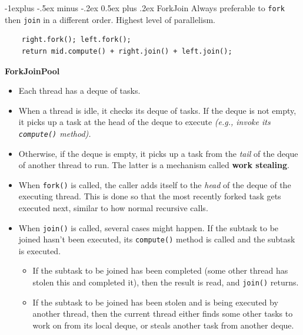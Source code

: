 \documentclass[10pt, landscape]{article}
\makeatletter
\renewcommand{\subsection}{\@startsection{subsection}{2}{0mm}%
                                {-1explus -.5ex minus -.2ex}%
                                {0.5ex plus .2ex}%
                                {\normalfont\normalsize\bfseries}}
\newcommand{\code}[1]{\textcolor{mygreen}{\texttt{#1}}}
\makeatother
\begin{document}
\begin{multicols}{2}
\subsection{ForkJoin}
Always preferable to \code{fork} then \code{join} in a different order. Highest level of parallelism.
\begin{verbatim}
    right.fork(); left.fork();
    return mid.compute() + right.join() + left.join();
\end{verbatim}

\textbf{ForkJoinPool}

\begin{itemize}
    \item Each thread has a deque of tasks.
    \item When a thread is idle, it checks its deque of tasks. If the deque is not empty, it picks up a task at the head of the deque to execute \textit{(e.g., invoke its \code{compute()} method).}
    \item Otherwise, if the deque is empty, it picks up a task from the \textit{tail} of the deque of another thread to run. The latter is a mechanism called \textbf{work stealing}.
    \item When \code{fork()} is called, the caller adds itself to the \textit{head} of the deque of the executing thread. This is done so that the most recently forked task gets executed next, similar to how normal recursive calls.
    \item When \code{join()} is called, several cases might happen. If the subtask to be joined hasn't been executed, its \code{compute()} method is called and the subtask is executed.
    \begin{itemize}
        \item If the subtask to be joined has been completed (some other thread has stolen this and completed it), then the result is read, and \code{join()} returns.
        \item If the subtask to be joined has been stolen and is being executed by another thread, then the current thread either finds some other tasks to work on from its local deque, or steals another task from another deque.
    \end{itemize}
\end{itemize}




\end{multicols}

\hline
\end{document}
